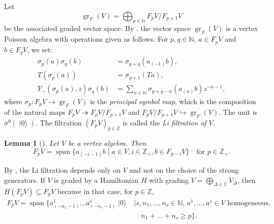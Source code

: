 \documentclass[a4paper, 12pt, reqno]{amsart}
\newtheorem{lemma}[theorem]{Lemma}
\theoremstyle{remark}
\DeclareMathOperator{\vac}{|0\rangle}
\DeclareMathOperator{\gr}{gr}
\DeclareMathOperator{\vspan}{span}
\begin{document}
Let
\begin{equation*}
  \gr_F(V) = \bigoplus_{p \in \mathbb{N}}F_pV/F_{p + 1}V
\end{equation*}
be the associated graded vector space.
By \cite{li_abelianizing_2005}, the vector space $\gr_F(V)$ is a vertex Poisson algebra with operations given as follows.
For $p, q \in \mathbb{N}$, $a \in F_pV$ and $b \in F_qV$, we set:
\begin{align*}
  \sigma_p(a)\sigma_q(b) &= \sigma_{p + q}(a_{(-1)}b), \\
  T(\sigma_p(a)) &= \sigma_{p + 1}(Ta), \\
  Y_-(\sigma_p(a), z)\sigma_q(b) &= \sum_{n \in \mathbb{N}}\sigma_{p + q - n}(a_{(n)}b)z^{-n - 1},
\end{align*}
where $\sigma_p: F_pV \to \gr_F(V)$ is the \emph{principal symbol map}, which is the composition of the natural maps $F_pV \twoheadrightarrow F_pV/F_{p + 1}V$ and $F_pV/F_{p + 1}V \hookrightarrow \gr_F(V)$.
The unit is $\sigma^0(\vac)$.
The filtration $(F_pV)_{p \in \mathbb{Z}}$ is called the \emph{Li filtration of $V$}.

\begin{lemma}[{\cite[Lemma 2.9]{li_abelianizing_2005}}]
  \label{lmm:4}
  Let $V$ be a vertex algebra.
  Then
  \begin{equation*}
    F_pV = \vspan\{a_{(-i - 1)}b \mid a \in V, i \in \mathbb{Z}_+, b \in F_{p - i}V\} \quad \text{for $p \in \mathbb{Z}_+$}.
  \end{equation*}
\end{lemma}

By , the Li filtration depends only on $V$ and not on the choice of the strong generators.
If $V$ is graded by a Hamiltonian $H$ with grading $V = \bigoplus_{\Delta \in \mathbb{C}}V_{\Delta}$, then $H(F_pV) \subseteq F_pV$ because in that case, for $p \in \mathbb{Z}$,
\begin{equation*}
  \begin{split}
    F_pV = \vspan\{a^1_{(-n_1 - 1)}\dots a^s_{(-n_s - 1)}\vac &\mid \text{$s, n_1, \dots, n_s \in \mathbb{N}$, $a^1, \dots, a^s \in V$ homogeneous,} \\
                                                              &\quad n_1 + \dots + n_s \ge p\}.
  \end{split}
\end{equation*}
\end{document}

